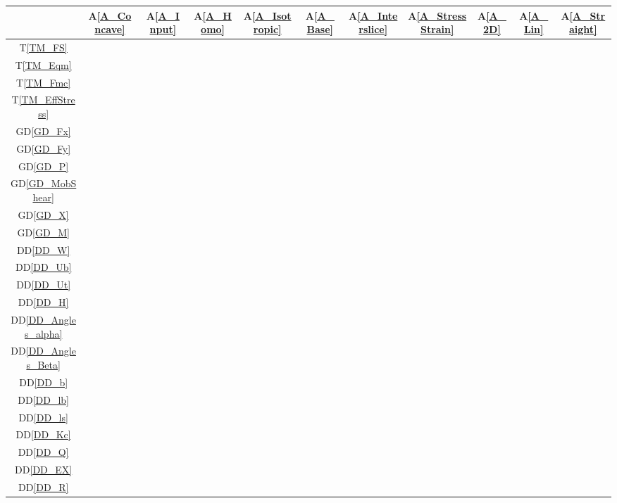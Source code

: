 \documentclass[12pt]{article}
\newcommand{\aref}[1]{A\ref{#1}}
\newcommand{\tref}[1]{T\ref{#1}}
\newcommand{\ddref}[1]{DD\ref{#1}}
\newcommand{\dref}[1]{GD\ref{#1}}
\begin{document}
\setlength{\tabcolsep}{6pt}

\begin{table}[h!]
\centering
\begin{tabular}{|c|c|c|c|c|c|c|c|c|c|c|}
\hline
& \aref{A_Concave}& \aref{A_Input}& \aref{A_Homo}& 
\aref{A_Isotropic}& \aref{A_Base}& \aref{A_Interslice}& 
\aref{A_StressStrain}& \aref{A_2D}& \aref{A_Lin}& \aref{A_Straight}\\
\hline
\tref{TM_FS}            & & & & & & & & & & \\ \hline
\tref{TM_Eqm}           & & & & & & & & & & \\ \hline
\tref{TM_Fmc}           & & & & & & & & & & \\ \hline
\tref{TM_EffStress}     & & & & & & & & & & \\ \hline
\dref{GD_Fx}            & & & & & & & & & & \\ \hline
\dref{GD_Fy}            & & & & & & & & & & \\ \hline
\dref{GD_P}             & & & & & & & & & & \\ \hline
\dref{GD_MobShear}      & & & & & & & & & & \\ \hline
\dref{GD_X}             & & & & & & & & & & \\ \hline
\dref{GD_M}             & & & & & & & & & & \\ \hline
\ddref{DD_W}            & & & & & & & & & & \\ \hline
\ddref{DD_Ub}           & & & & & & & & & & \\ \hline
\ddref{DD_Ut}           & & & & & & & & & & \\ \hline
\ddref{DD_H}            & & & & & & & & & & \\ \hline
\ddref{DD_Angles_alpha} & & & & & & & & & & \\ \hline
\ddref{DD_Angles_Beta}  & & & & & & & & & & \\ \hline
\ddref{DD_b}            & & & & & & & & & & \\ \hline
\ddref{DD_lb}           & & & & & & & & & & \\ \hline
\ddref{DD_ls}           & & & & & & & & & & \\ \hline
\ddref{DD_Kc}           & & & & & & & & & & \\ \hline
\ddref{DD_Q}            & & & & & & & & & & \\ \hline
\ddref{DD_EX}           & & & & & & & & & & \\ \hline
\ddref{DD_R}            & & & & & & & & & & \\ \hline

\end{tabular}
\end{table}
\end{document}
